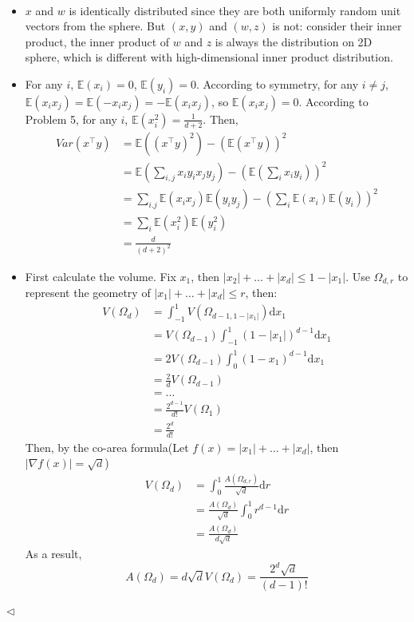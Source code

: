 \documentclass[11pt]{article}
\newenvironment{answer}[1][Answer]{\begin{trivlist}
\item[\hskip \labelsep {\bfseries #1.}\hskip \labelsep]}{\hfill$\lhd$\end{trivlist}}
\newcommand\E{\mathbb{E}}
\newcommand\dd{\mathrm{d}}
\begin{document}
\begin{answer} ~
\begin{itemize}
    \item [(1)] $x$ and $w$ is identically distributed since they are both uniformly random unit vectors from the sphere. But $(x,y)$ and $(w,z)$ is not: consider their inner product, the inner product of $w$ and $z$ is always the distribution on 2D sphere, which is different with high-dimensional inner product distribution.
    \item [(2)] For any $i$, $\E(x_i) = 0$, $\E(y_i) = 0$. According to symmetry, for any $i \neq j$, $\E(x_ix_j) = \E(-x_ix_j) = -\E(x_ix_j)$, so $\E(x_ix_j) = 0$. According to Problem 5, for any $i$, $\E(x_i^2) = \frac{1}{d+2}$. Then,
    \[\begin{aligned}
    Var(x^\top y) &= \E((x^\top y)^2) - (\E(x^\top y))^2 \\
    &= \E\left(\sum_{i,j} x_iy_ix_jy_j\right) - \left(\E\left(\sum_i x_iy_i\right)\right)^2 \\
    &= \sum_{i.j}\E(x_ix_j)\E(y_iy_j) - \left(\sum_i \E(x_i)\E(y_i)\right)^2 \\
    &= \sum_i \E(x_i^2)\E(y_i^2) \\
    &= \frac{d}{(d+2)^2}
    \end{aligned}\]
    \item [(3)] First calculate the volume. Fix $x_1$, then $|x_2| + \dots + |x_d| \le 1 - |x_1|$. Use $\Omega_{d, r}$ to represent the geometry of $|x_1| + \dots + |x_d| \le r$, then:
    \[\begin{aligned}
    V(\Omega_d) &= \int_{-1}^1 V(\Omega_{d-1, 1-|x_1|}) \dd x_1 \\
    &= V(\Omega_{d-1}) \int_{-1}^1 (1-|x_1|)^{d-1} \dd x_1 \\
    &= 2V(\Omega_{d-1}) \int_0^1 (1-x_1)^{d-1} \dd x_1 \\
    &= \frac{2}{d} V(\Omega_{d-1}) \\
    &= \dots \\
    &= \frac{2^{d-1}}{d!} V(\Omega_{1}) \\
    &= \frac{2^d}{d!}
    \end{aligned}\]
    Then, by the co-area formula(Let $f(x) = |x_1| + \dots + |x_d|$, then $|\nabla f(x)| = \sqrt{d}$)
    \[\begin{aligned}
    V(\Omega_d) &= \int_0^1 \frac{A(\Omega_{d,r})}{\sqrt{d}} \dd r \\
    &= \frac{A(\Omega_d)}{\sqrt{d}} \int_0^1 r^{d-1} \dd r \\
    &= \frac{A(\Omega_d)}{d\sqrt{d}}
    \end{aligned}\]
    As a result,
    \[
    A(\Omega_d) = d\sqrt{d}V(\Omega_d) = \frac{2^d\sqrt{d}}{(d-1)!}
    \]
\end{itemize}
\end{answer}
\end{document}
